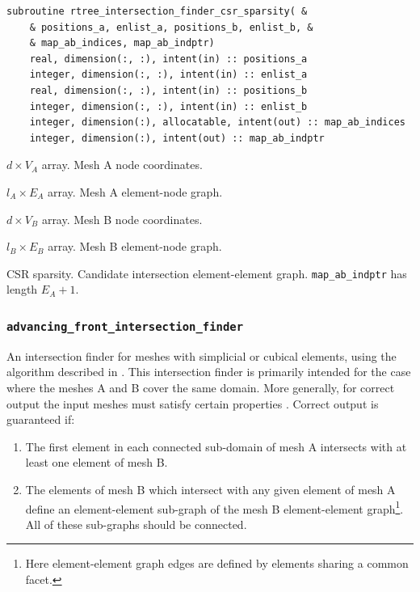 \documentclass{article}
\begin{document}
\begin{lstlisting}[language=FORTRAN]
  subroutine rtree_intersection_finder_csr_sparsity( &
    & positions_a, enlist_a, positions_b, enlist_b, &
    & map_ab_indices, map_ab_indptr)
    real, dimension(:, :), intent(in) :: positions_a
    integer, dimension(:, :), intent(in) :: enlist_a
    real, dimension(:, :), intent(in) :: positions_b
    integer, dimension(:, :), intent(in) :: enlist_b
    integer, dimension(:), allocatable, intent(out) :: map_ab_indices
    integer, dimension(:), intent(out) :: map_ab_indptr
\end{lstlisting}

\begin{description}[font=\ttfamily\bfseries,leftmargin=2.2\parindent,labelindent=1.7\parindent,noitemsep]
  \item[positions\_a] $d \times V_A$ array. Mesh A node coordinates.
  \item[enlist\_a] $l_A \times E_A$ array. Mesh A element-node graph.
  \item[positions\_b] $d \times V_B$ array. Mesh B node coordinates.
  \item[enlist\_b] $l_B \times E_B$ array. Mesh B element-node graph.
  \item[map\_ab\_indices, map\_ab\_indptr] CSR sparsity. Candidate intersection
    element-element graph. \linebreak \verb+map_ab_indptr+ has length $E_A + 1$.
\end{description}

\subsubsection{\texttt{advancing\_front\_intersection\_finder}}

An intersection finder for meshes with simplicial or cubical elements, using
the algorithm described in \citet{farrell2011}
\citep[see also][]{gander2009,gander2013}. This intersection finder is primarily
intended for the case where the meshes A and B cover the same domain. More
generally, for correct output the input meshes must satisfy certain properties
\citep{gander2009}. Correct output is guaranteed if:
\begin{enumerate}
  \item The first element in each connected sub-domain of mesh A intersects with
        at least one element of mesh B.
  \item The elements of mesh B which intersect with any given element of mesh A
        define an element-element sub-graph of the mesh B element-element
        graph\footnote{Here element-element graph edges are defined by elements
        sharing a common facet.}. All of these sub-graphs should be connected. 
\end{enumerate}
\end{document}
